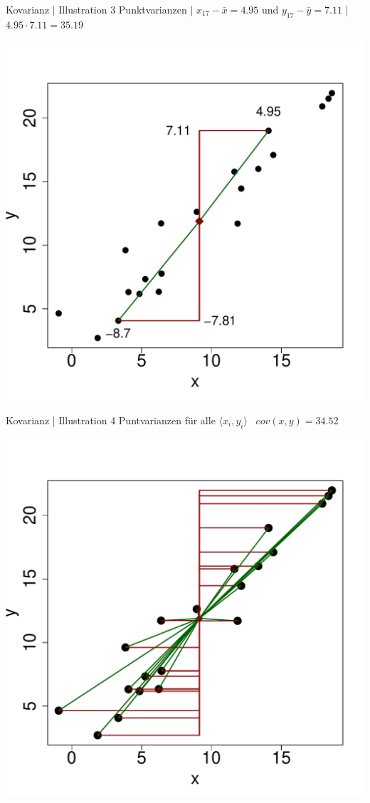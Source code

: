 \begin{frame}
  {Kovarianz | Illustration 3}
  Punktvarianzen | $x_{17}-\bar{x}=4.95$ und $y_{17}-\bar{y}=7.11$ | \alert{$4.95\cdot7.11=35.19$}\\
  \begin{center}
    \includegraphics[height=0.7\textheight]{graphics/cov04}
  \end{center}
\end{frame}


\begin{frame}
  {Kovarianz | Illustration 4}
  Puntvarianzen für alle $\langle x_i,y_i\rangle$ \ $cov(x,y)=34.52$\\
  \begin{center}
    \includegraphics[height=0.7\textheight]{graphics/cov05}
  \end{center}
\end{frame}


